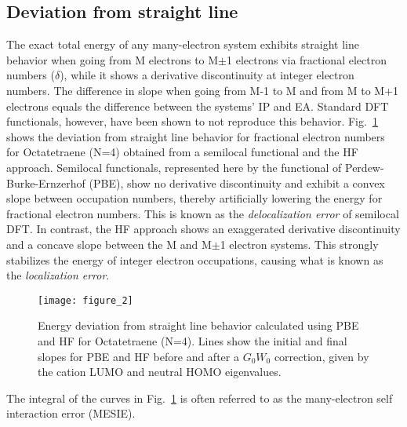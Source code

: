 \documentclass[journal=jctcce,manuscript=article,layout=twocolumn]{achemso}
\begin{document}
\subsection*{Deviation from straight line}
The exact total energy of any many-electron system exhibits straight line behavior when going from M electrons to M$\pm$1 electrons via fractional electron numbers ($\delta$), while it shows a derivative discontinuity at integer electron numbers.\cite{phys_rev_let_1982_derivative_discont} The difference in slope when going from M-1 to M and from M to M+1 electrons equals the difference between the systems' IP and EA. 
Standard DFT functionals, however, have been shown to not reproduce this behavior. \cite{jcp_2006_mesie_common_functionals,jcp_2006_mesie_frac_charge_dft_functionals, phys_rev_let_2008_loc_deloc_error_bandgaps} Fig.~\ref{DSLE_frac} shows the deviation from straight line behavior for fractional electron numbers for Octatetraene (N=4) obtained from
a semilocal functional and the HF approach. Semilocal functionals, represented here by the functional of Perdew-Burke-Ernzerhof (PBE), show no derivative discontinuity and exhibit a convex slope between occupation numbers, thereby artificially lowering the
energy for fractional electron numbers. This is known as the {\sl delocalization error} of semilocal DFT. In contrast, the HF approach shows an exaggerated derivative discontinuity and a concave slope between the M and M$\pm$1 electron systems. This strongly
stabilizes the energy of integer electron occupations, causing what is known as the {\sl localization error}.
\begin{figure}[t]
\texttt{[image: figure\_2]}
\caption{Energy deviation from straight line behavior calculated using PBE and HF for Octatetraene (N=4). Lines show the initial and final slopes for PBE and HF before and after a $G_0W_0$ correction, 
given by the cation LUMO and neutral HOMO eigenvalues.\label{DSLE_frac}}
\end{figure}
The integral of the curves in Fig.~\ref{DSLE_frac} is often referred to as the many-electron self interaction error (MESIE).\cite{jcp_2006_mesie_frac_charge_dft_functionals,jcp_2006_mesie_common_functionals}
\end{document}
